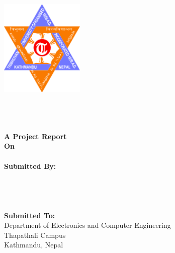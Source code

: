 \begin{titlepage}
   \begin{center}
   	\begin{spacing}{1.5}
   	\includegraphics[width=4cm]{images/logo.png}

    \vspace{8mm} 
	\textbf{\MakeUppercase{\cUniversity}}\\
	\textbf{\MakeUppercase{\cDepartment} }\\
	\textbf{\MakeUppercase{\cCampus}} \\
	\vfill
	\textbf{A Project Report \\ On \\ }
	\textbf{\MakeUppercase{\cTitle}}\\
	\vfill
	\textbf{Submitted By:} \\
	\cSubmittedI \\
	\cSubmittedII \\
	\cSubmittedIII \\
	\cSubmittedIV \\
	\vfill
	\textbf{Submitted To:} \\
	Department of Electronics and Computer Engineering \\ Thapathali Campus \\ Kathmandu, Nepal \\
    \vfill
    \cDate 
	 
    \end{spacing}
    \end{center}
\end{titlepage}
